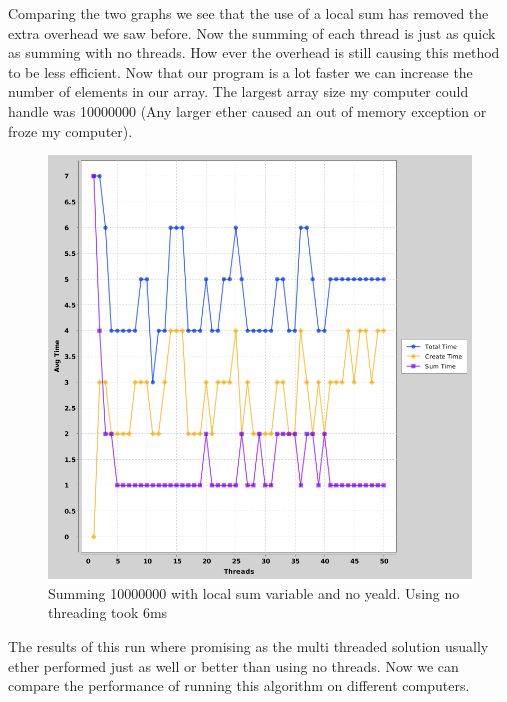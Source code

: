 \documentclass[a4paper, 12pt]{article}
\begin{document}
		Comparing the two graphs we see that the use of a local sum has removed the extra overhead we saw before. Now the summing of each thread is just as quick as summing with no threads. How ever the overhead is still causing this method to be less efficient. Now that our program is a lot faster we can increase the number of elements in our array. The largest array size my computer could handle was 10000000 (Any larger ether caused an out of memory exception or froze my computer).
		
		
		\begin{figure}[H]
  			\includegraphics[scale=0.5]{threads-vs-time-10000000-laptop.png}
  			\caption{Summing 10000000 with local sum variable and no yeald. Using no threading took 6ms}\hfill
		\end{figure}
		
		The results of this run where promising as the multi threaded solution usually ether performed just as well or better than using no threads. Now we can compare the performance of running this algorithm on different computers.
		
\end{document}
